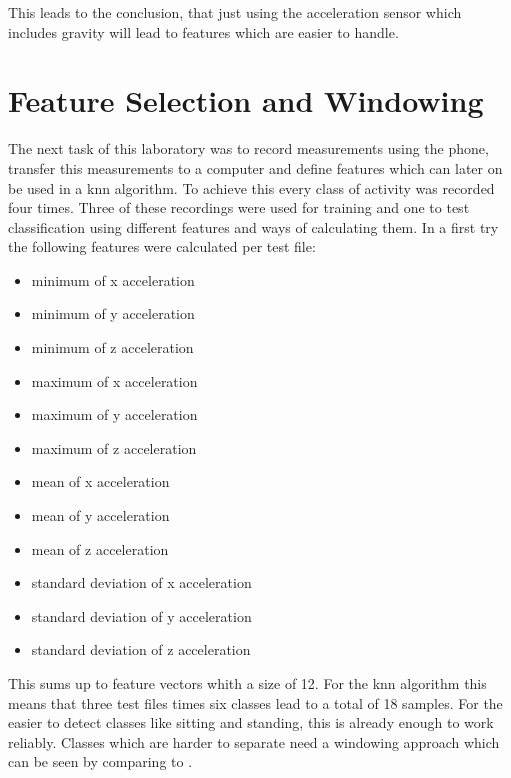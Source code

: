 This leads to the conclusion, that just using the acceleration sensor which includes gravity will lead to features which are easier to handle.

\section{Feature Selection and Windowing}
\label{sec:features}
The next task of this laboratory was to record measurements using the phone, transfer this measurements to a computer and define features which can later on be used in a \gls{knn} algorithm. To achieve this every class of activity was recorded four times. Three of these recordings were used for training and one to test classification using different features and ways of calculating them. In a first try the following features were calculated per test file:
\begin{itemize}
\item minimum of x acceleration
\item minimum of y acceleration
\item minimum of z acceleration
\item maximum of x acceleration
\item maximum of y acceleration
\item maximum of z acceleration
\item mean of x acceleration
\item mean of y acceleration
\item mean of z acceleration
\item standard deviation of x acceleration
\item standard deviation of y acceleration
\item standard deviation of z acceleration
\end{itemize}
This sums up to feature vectors whith a size of 12. For the \gls{knn} algorithm this means that three test files times six classes lead to a total of 18 samples. For the easier to detect classes like sitting and standing, this is already enough to work reliably. Classes which are harder to separate need a windowing approach which can be seen by comparing  to .
